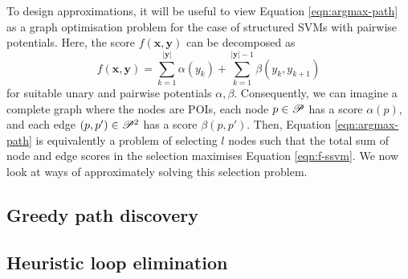 
To design approximations, it will be useful to view Equation \ref{eqn:argmax-path} as a graph optimisation problem
for the case of structured SVMs with pairwise potentials.
Here, the score $f(\mathbf{x}, \mathbf{y})$ can be decomposed as
\begin{equation}
	\label{eqn:f-ssvm}
	f(\mathbf{x}, \mathbf{y}) = \sum_{k = 1}^{|\mathbf{y}|} \alpha( y_k ) + \sum_{k = 1}^{|\mathbf{y}| - 1} \beta( y_k, y_{k+1} )
\end{equation}
for suitable unary and pairwise potentials $\alpha, \beta$.
Consequently, we can imagine a complete graph where the nodes are POIs, each node $p \in \mathscr{P}$ has a score $\alpha( p )$, and each edge $(p, p') \in \mathscr{P}^2$ has a score $\beta( p, p' )$.
Then, Equation \ref{eqn:argmax-path} is equivalently a problem of selecting $l$ nodes such that
the total sum of node and edge scores in the selection maximises Equation \ref{eqn:f-ssvm}.
We now look at ways of approximately solving this selection problem.

\subsection{Greedy path discovery}
\label{sec:greedy}


\subsection{Heuristic loop elimination}
\label{sec:loop-elim}


% 
